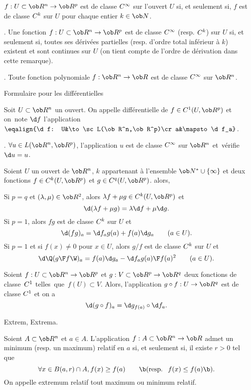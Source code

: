 \Definition []  $f:U\subset\ob R^n\to\ob R^p$ est de classe $\sc C^\infty$ 
sur l'ouvert $U$ si, et seulement si, $f$ est de classe $\sc C^k$ sur $U$ 
pour chaque entier $k\in\ob N$. 
\bigskip

\Remarque. Une fonction $f:U\subset\ob R^n\to\ob R^p$ est de classe $\sc C^\infty$ 
(resp. $\sc C^k$) sur $U$ si, et seulement si, toutes ses dérivées partielles 
(resp. d'ordre total inférieur à $k$) existent et sont continues sur $U$ 
(on tient compte de l'ordre de dérivation dans cette remarque). 
\bigskip

\Exemple.  Toute fonction polynomiale $f:\ob R^n\to\ob R$ est de classe $\sc C^\infty$ 
sur $\ob R^n$. 
\bigskip


\Concept [] Formulaire pour les différentielles

\Definition []  Soit $U\subset\ob R^n$ un ouvert. 
On appelle différentielle de $f\in\sc C^1(U,\ob R^p)$ et on~note $\d f$ 
l'application $\eqalign{\d f: U&\to\sc L(\ob R^n,\ob R^p)\cr  a&\mapsto \d f_a}$.
\bigskip

\Exemple.  $\forall u\in\sc L(\ob R^n,\ob R^p)$, l'application $u$ 
est de classe $\sc C^\infty$ sur $\ob R^n$ et~vérifie~$\d u=u$. 
\bigskip 

\Propriete []  Soient $U$ un ouvert de $\ob R^n$, $k$ appartenant à l'ensemble $\ob N^*\cup\{\infty\}$ et deux fonctions $f\in\sc C^k(U,\ob R^p)$ et $g\in\sc C^q(U,\ob R^p)$. alors, 
\medskip
 
Si $p=q$ et $(\lambda,\mu)\in\ob R^2$, alors $\lambda f+\mu g\in\sc C^k(U,\ob R^p)$ 
et 
$$
\d(\lambda f+\mu g)=\lambda\d f+\mu\d g.
$$
Si $p=1$, alors $fg$ est de classe $\sc C^k$ sur $U$ et 
$$
\d(fg)_a=\d f_a g(a)+f(a)\d g_a\qquad(a\in U).
$$ 
Si $p=1$ et si $f(x)\neq 0$ pour $x\in U$, alors $g/f$ 
est de classe $\sc C^k$ sur $U$ et 
$$
\d\Q({g\F f}\W)_a={f(a)\d g_a-\d f_ag(a)\F f(a)^2}\qquad(a\in U).
$$ 

\Theoreme []  Soient $f:U\subset\ob R^n\to\ob R^p$ et $g:V\subset\ob R^p\to\ob R^q$ 
deux fonctions de classe~$\sc C^1$ telles~que~$f(U)\subset V$. Alors, l'application $g\circ f:U\to\ob R^q$ 
est de classe $\sc C^1$ et on a 
$$
\d(g\circ f)_a=\d g_{f(a)}\circ \d f_a.
$$ 

\Section Extrem, Extrema. 

\Definition []  Soient $A\subset\ob R^n$ et $a\in A$. 
L'application $f:A\subset\ob R^n\to\ob R$ admet un minimum (resp. un maximum) relatif en $a$ si, et seulement si, 
il existe $r>0$ tel que 
$$
\forall x\in B(a,r)\cap A, f(x)\ge f(a)\qquad\b(\mbox{resp. }\ f(x)\le f(a)\b).
$$
On appelle extremum relatif tout maximum ou minimum relatif. 
\bigskip

